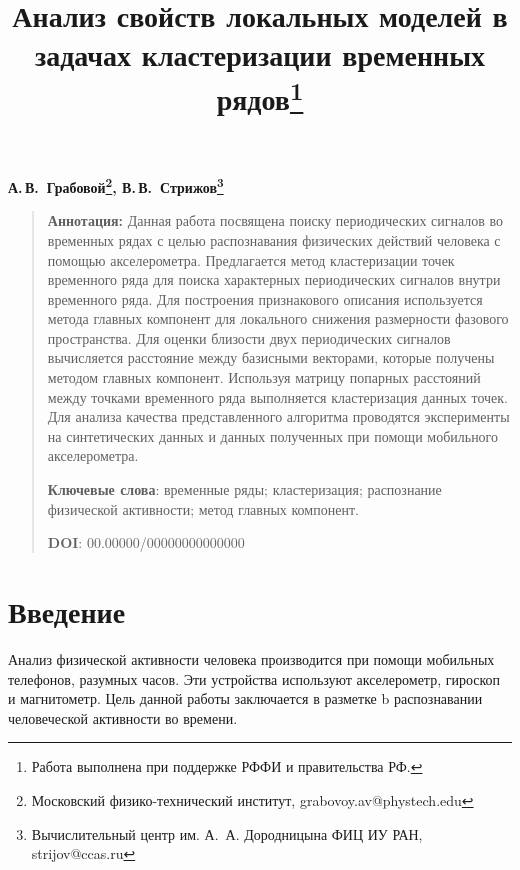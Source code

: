 \documentclass[12pt, twoside]{article}
\numberwithin{equation}{section}
\begin{document}

\title{\bf Анализ свойств локальных моделей в задачах кластеризации временных рядов\thanks{Работа выполнена при поддержке РФФИ и правительства РФ.}}
\date{}
\author{}
\maketitle

\begin{center}
\bf
А.\,В.~Грабовой\footnote{Московский физико-технический институт, grabovoy.av@phystech.edu}, В.\,В.~Стрижов\footnote{Вычислительный центр им. А.~А. Дородницына	ФИЦ ИУ РАН, strijov@ccas.ru}

\end{center}

{\centering\begin{quote}
\textbf{Аннотация:} Данная работа посвящена поиску периодических сигналов во временных рядах с целью распознавания физических действий человека с помощью акселерометра. Предлагается метод кластеризации точек временного ряда для поиска характерных периодических сигналов внутри временного ряда. Для построения признакового описания используется метода главных компонент для локального снижения размерности фазового пространства. Для оценки близости двух периодических сигналов вычисляется расстояние между базисными векторами, которые получены методом главных компонент. Используя матрицу попарных расстояний между точками временного ряда выполняется кластеризация данных точек. Для анализа качества представленного алгоритма проводятся эксперименты на синтетических данных и данных полученных при помощи мобильного акселерометра.


\smallskip
\textbf{Ключевые слова}: временные ряды; кластеризация; распознание физической активности; метод главных компонент.

\smallskip
\textbf{DOI}: 00.00000/00000000000000
\end{quote}
}

\section{Введение}
Анализ физической активности человека производится при помощи мобильных телефонов, разумных часов. Эти устройства используют акселерометр, гироскоп и магнитометр. Цель данной работы заключается в  разметке b распознавании человеческой активности во времени. %
\end{document}

